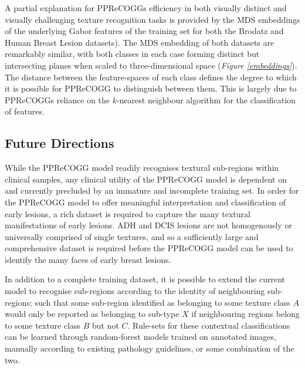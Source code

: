 A partial explanation for PPReCOGGs efficiency in both visually distinct and visually challenging texture recognition tasks is provided by the MDS embeddings of the underlying Gabor features of the training set for both the Brodatz and Human Breast Lesion datasets). The MDS embedding of both datasets are remarkably similar, with both classes in each case forming distinct but intersecting planes when scaled to three-dimensional space (\textit{Figure \ref{embeddings}}). The distance between the feature-spaces of each class defines the degree to which it is possible for PPReCOGG to distinguish between them. This is largely due to PPReCOGGs reliance on the $k$-nearest neighbour algorithm for the classification of features.\par

\subsection{Future Directions}
While the PPReCOGG model readily recognises textural sub-regions within clinical samples, any clinical utility of the PPReCOGG model is dependent on and currently precluded by an immature and incomplete training set. In order for the PPReCOGG model to offer meaningful interpretation and classification of early lesions, a rich dataset is required to capture the many textural manifestations of early lesions. ADH and DCIS lesions are not homogenously or universally comprised of single textures, and so a sufficiently large and comprehensive dataset is required before the PPReCOGG model can be used to identify the many faces of early breast lesions. \par

In addition to a complete training dataset, it is possible to extend the current model to recognise sub-regions according to the identity of neighbouring sub-regions; such that some sub-region identified as belonging to some texture class $A$ would only be reported as belonging to sub-type $X$ if neighbouring regions belong to some texture class $B$ but not $C$. Rule-sets for these contextual classifications can be learned through random-forest models trained on annotated images, manually according to existing pathology guidelines, or some combination of the two. \par

